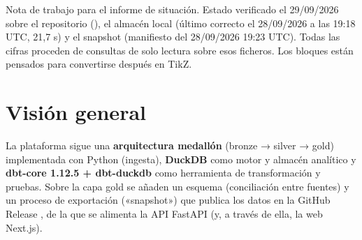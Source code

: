 \begin{nota}
Nota de trabajo para el informe de situación. Estado verificado el 29/09/2026 sobre el repositorio (), el almacén local  (último  correcto el 28/09/2026 a las 19:18 UTC, 21,7 s) y el snapshot  (manifiesto del 28/09/2026 19:23 UTC). Todas las cifras proceden de consultas de solo lectura sobre esos ficheros. Los bloques  están pensados para convertirse después en TikZ.
\end{nota}

\section{Visión general}

La plataforma sigue una \textbf{arquitectura medallón} (bronze → silver → gold) implementada con Python (ingesta), \textbf{DuckDB} como motor y almacén analítico y \textbf{dbt-core 1.12.5 + dbt-duckdb} como herramienta de transformación y pruebas. Sobre la capa gold se añaden un esquema  (conciliación entre fuentes) y un proceso de exportación («snapshot») que publica los datos en la GitHub Release , de la que se alimenta la API FastAPI (y, a través de ella, la web Next.js).

